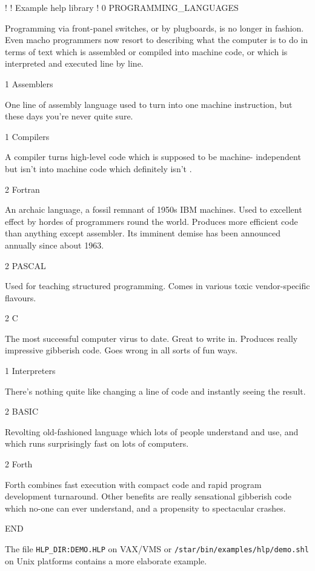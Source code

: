 \documentclass[11pt,nolof]{starlink}
\begin{document}
\begin{small}
\begin{terminalv}
!
!  Example help library
!
0 PROGRAMMING_LANGUAGES

Programming via front-panel switches, or by plugboards, is no longer
in fashion.  Even macho programmers now resort to describing what the
computer is to do in terms of text which is assembled or compiled into
machine code, or which is interpreted and executed line by line.

1 Assemblers

One line of assembly language used to turn into one machine instruction,
but these days you're never quite sure.

1 Compilers

A compiler turns high-level code which is supposed to be machine-
independent but isn't into machine code which definitely isn't .

2 Fortran

An archaic language, a fossil remnant of 1950s IBM machines.  Used
to excellent effect by hordes of programmers round the world.  Produces
more efficient code than anything except assembler.  Its imminent
demise has been announced annually since about 1963.

2 PASCAL

Used for teaching structured programming.  Comes in various toxic
vendor-specific flavours.

2 C

The most successful computer virus to date.  Great to write in.
Produces really impressive gibberish code.  Goes wrong in all sorts
of fun ways.

1 Interpreters

There's nothing quite like changing a line of code and instantly
seeing the result.

2 BASIC

Revolting old-fashioned language which lots of people understand
and use, and which runs surprisingly fast on lots of computers.

2 Forth

Forth combines fast execution with compact code and rapid program
development turnaround.  Other benefits are really sensational
gibberish code which no-one can ever understand, and a propensity
to spectacular crashes.

END
\end{terminalv}
\end{small}

The file \texttt{HLP\_DIR:DEMO.HLP} on VAX/VMS or
\texttt{/star/bin/examples/hlp/demo.shl} on Unix platforms
contains a more elaborate example.
\end{document}

